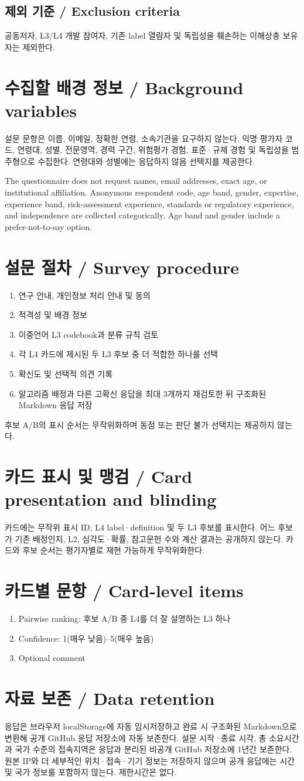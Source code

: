 \documentclass[11pt,a4paper]{article}
\newcommand{\bisection}[2]{\section{#1 / \texorpdfstring{\color{teal}}{}#2}}
\newcommand{\bisubsection}[2]{\subsection{#1 / #2}}
\begin{document}
\bisubsection{제외 기준}{Exclusion criteria}
공동저자, L3/L4 개발 참여자, 기존 label 열람자 및 독립성을 훼손하는 이해상충 보유자는 제외한다.

\bisection{수집할 배경 정보}{Background variables}
설문 문항은 이름, 이메일, 정확한 연령, 소속기관을 요구하지 않는다. 익명 평가자 코드, 연령대, 성별, 전문영역, 경력 구간, 위험평가 경험, 표준·규제 경험 및 독립성을 범주형으로 수집한다. 연령대와 성별에는 응답하지 않음 선택지를 제공한다.

The questionnaire does not request names, email addresses, exact age, or institutional affiliation. Anonymous respondent code, age band, gender, expertise, experience band, risk-assessment experience, standards or regulatory experience, and independence are collected categorically. Age band and gender include a prefer-not-to-say option.

\bisection{설문 절차}{Survey procedure}
\begin{enumerate}
\item 연구 안내, 개인정보 처리 안내 및 동의
\item 적격성 및 배경 정보
\item 이중언어 L3 codebook과 분류 규칙 검토
\item 각 L4 카드에 제시된 두 L3 후보 중 더 적합한 하나를 선택
\item 확신도 및 선택적 의견 기록
\item 알고리즘 배정과 다른 고확신 응답을 최대 3개까지 재검토한 뒤 구조화된 Markdown 응답 저장
\end{enumerate}
후보 A/B의 표시 순서는 무작위화하며 동점 또는 판단 불가 선택지는 제공하지 않는다.

\bisection{카드 표시 및 맹검}{Card presentation and blinding}
카드에는 무작위 표시 ID, L4 label·definition 및 두 L3 후보를 표시한다. 어느 후보가 기존 배정인지, L2, 심각도·확률, 참고문헌 수와 계산 결과는 공개하지 않는다. 카드와 후보 순서는 평가자별로 재현 가능하게 무작위화한다.

\bisection{카드별 문항}{Card-level items}
\begin{enumerate}
\item Pairwise ranking: 후보 A/B 중 L4를 더 잘 설명하는 L3 하나
\item Confidence: 1(매우 낮음)--5(매우 높음)
\item Optional comment
\end{enumerate}

\bisection{자료 보존}{Data retention}
응답은 브라우저 localStorage에 자동 임시저장하고 완료 시 구조화된 Markdown으로 변환해 공개 GitHub 응답 저장소에 자동 보존한다. 설문 시작·종료 시각, 총 소요시간과 국가 수준의 접속지역은 응답과 분리된 비공개 GitHub 저장소에 1년간 보존한다. 원본 IP와 더 세부적인 위치·접속·기기 정보는 저장하지 않으며 공개 응답에는 시간 및 국가 정보를 포함하지 않는다. 제한시간은 없다.
\end{document}
